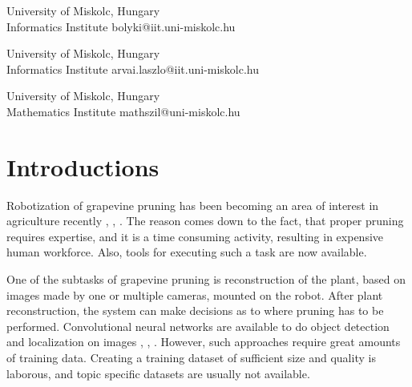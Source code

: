 \documentclass{PSAIE}%
\begin{document}
%
%
%


\fancyfoot{}

\noindent{} %

\noindent{}
{University of Miskolc, Hungary\\[0pt] Informatics Institute}
{bolyki@iit.uni-miskolc.hu}

\noindent{}
{University of Miskolc, Hungary\\[0pt] Informatics Institute}
{arvai.laszlo@iit.uni-miskolc.hu}

\noindent{}
{University of Miskolc, Hungary\\[0pt] Mathematics Institute}
{mathszil@uni-miskolc.hu}

\noindent\PSAIEreceived{\today}

\noindent{}

\noindent{}


\section{Introductions}
Robotization of grapevine pruning has been becoming an area of interest in agriculture recently
\cite{botterill2017robot}, \cite{fernandes2021grapevine}, \cite{katyara2020reproducible}. The reason
comes down to the fact, that proper pruning requires expertise, and it is a time consuming activity,
resulting in expensive human workforce. Also, tools for executing such a task are now available.

One of the subtasks of grapevine pruning is reconstruction of the plant, based on images made by
one or multiple cameras, mounted on the robot. After plant reconstruction, the system can make decisions
as to where pruning has to be performed. Convolutional neural networks are available to do
object detection and localization on images \cite{glenn_jocher_2021_5563715}, \cite{matterport_maskrcnn_2017},
\cite{liu2016ssd}. However, such approaches require great amounts of training data. Creating a training
dataset of sufficient size and quality is laborous, and topic specific datasets are usually not available.
\end{document}
